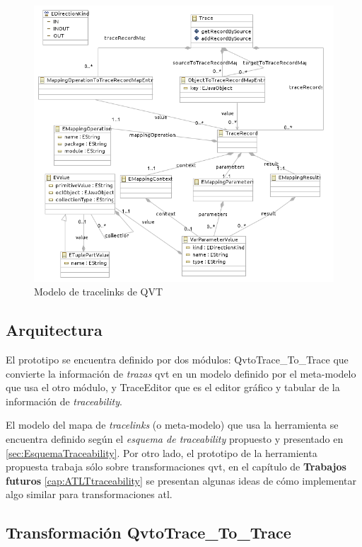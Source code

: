 \documentclass[a4paper,12pt,twoside,spanish,openright]{book}
\begin{document}
\begin{figure}[hbtp]
\centering
\includegraphics[scale=0.78]{./img/QVTTraceModel}
\caption{Modelo de tracelinks de QVT}
\label{fig:QVTTraceModel}
\end{figure}



\subsection{Arquitectura}


El prototipo se encuentra definido por dos módulos: \textsf{QvtoTrace\_To\_Trace} que convierte la información de \textit{trazas} \gls{qvt} en un modelo definido por el meta-modelo que usa el otro módulo, y \textsf{TraceEditor} que es el editor gráfico y tabular de la información de \textit{traceability}.

El modelo del mapa de \textit{tracelinks} (o meta-modelo) que usa la herramienta se encuentra definido según el \textit{esquema de traceability} propuesto y presentado en \ref{sec:EsquemaTraceability}. Por otro lado, el prototipo de la herramienta propuesta trabaja sólo sobre transformaciones \gls{qvt}, en el capítulo de \textbf{Trabajos futuros} \ref{cap:ATLTtraceability} se presentan algunas ideas de cómo implementar algo similar para transformaciones \gls{atl}.



\subsection{Transformación QvtoTrace{\_}To{\_}Trace}
\end{document}

